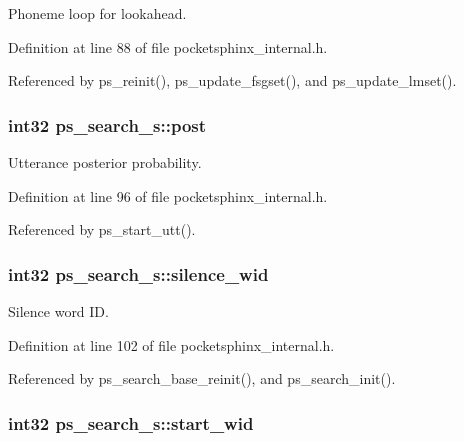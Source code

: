Phoneme loop for lookahead. 



Definition at line 88 of file pocketsphinx\-\_\-internal.\-h.



Referenced by ps\-\_\-reinit(), ps\-\_\-update\-\_\-fsgset(), and ps\-\_\-update\-\_\-lmset().

\subsubsection[{post}]{\setlength{\rightskip}{0pt plus 5cm}int32 ps\-\_\-search\-\_\-s\-::post}\label{structps__search__s_a721a656d0e34f7604ea8c52a1bdf14ff}


Utterance posterior probability. 



Definition at line 96 of file pocketsphinx\-\_\-internal.\-h.



Referenced by ps\-\_\-start\-\_\-utt().

\subsubsection[{silence\-\_\-wid}]{\setlength{\rightskip}{0pt plus 5cm}int32 ps\-\_\-search\-\_\-s\-::silence\-\_\-wid}\label{structps__search__s_ab6851b4675f38ab6b3683d75521f000b}


Silence word I\-D. 



Definition at line 102 of file pocketsphinx\-\_\-internal.\-h.



Referenced by ps\-\_\-search\-\_\-base\-\_\-reinit(), and ps\-\_\-search\-\_\-init().

\subsubsection[{start\-\_\-wid}]{\setlength{\rightskip}{0pt plus 5cm}int32 ps\-\_\-search\-\_\-s\-::start\-\_\-wid}\label{structps__search__s_ae1a9fa33bfc851ec91ce96870714b3cc}



